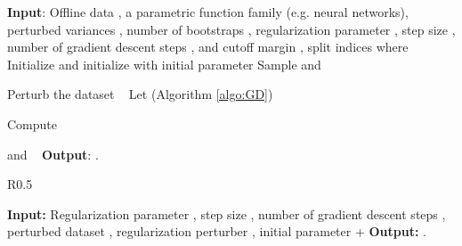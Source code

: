 \documentclass{article} \usepackage{iclr2023/iclr2023_conference,times}
\begin{document}
\begin{algorithm}[t]
\begin{algorithmic}[1]
\State \textbf{Input}: Offline data , a parametric function family  (e.g. neural networks), perturbed variances , number of bootstraps , regularization parameter , step size , number of gradient descent steps , and cutoff margin , split indices  where 
\State Initialize  and initialize  with initial parameter 
\For{}
\For{}
\State Sample  and 
\label{PERVI: sample noises}


\State Perturb the dataset  ~
\label{PERVI: perturb data}
\State Let  (Algorithm \ref{algo:GD}) 
\label{PERVI: GD}

\EndFor 

\State Compute   ~~~~
\label{PERVI: minimum of ensemble}






\State  and  \qquad~
\label{PERVI: greedy policy}
\EndFor
\State \textbf{Output}: .
\end{algorithmic}
\caption{{Value Iteration with Perturbed Rewards (VIPeR)}}
\label{algorithm: PERVI}
\end{algorithm}

\begin{wrapfigure}{R}{0.5\textwidth}
\vspace{-20pt}
\begin{minipage}{0.5\textwidth}
\begin{algorithm}[H]
\begin{algorithmic}[1]
\State \textbf{Input:} Regularization parameter , step size , number of gradient descent steps , perturbed dataset , regularization perturber , initial parameter  
\State  + 
\For{}
\State 
\EndFor 
\State \textbf{Output:} . 
\caption{GradientDescent}
\label{algo:GD}
\end{algorithmic}
\end{algorithm}
\end{minipage}
\end{wrapfigure}
\end{document}
